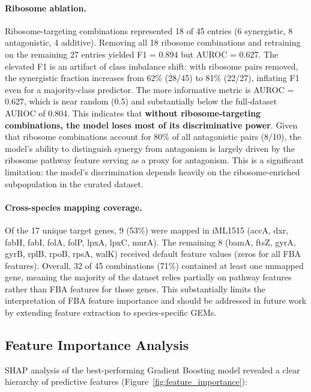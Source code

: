 \documentclass[12pt,a4paper]{article}
\begin{document}
\paragraph{Ribosome ablation.} Ribosome-targeting combinations represented 18 of 45 entries (6 synergistic, 8 antagonistic, 4 additive). Removing all 18 ribosome combinations and retraining on the remaining 27 entries yielded F1 = 0.894 but AUROC = 0.627. The elevated F1 is an artifact of class imbalance shift: with ribosome pairs removed, the synergistic fraction increases from 62\% (28/45) to 81\% (22/27), inflating F1 even for a majority-class predictor. The more informative metric is AUROC = 0.627, which is near random (0.5) and substantially below the full-dataset AUROC of 0.804. This indicates that \textbf{without ribosome-targeting combinations, the model loses most of its discriminative power}. Given that ribosome combinations account for 80\% of all antagonistic pairs (8/10), the model's ability to distinguish synergy from antagonism is largely driven by the ribosome pathway feature serving as a proxy for antagonism. This is a significant limitation: the model's discrimination depends heavily on the ribosome-enriched subpopulation in the curated dataset.

\paragraph{Cross-species mapping coverage.} Of the 17 unique target genes, 9 (53\%) were mapped in iML1515 (accA, dxr, fabH, fabI, folA, folP, lpxA, lpxC, murA). The remaining 8 (bamA, ftsZ, gyrA, gyrB, rplB, rpoB, rpsA, walK) received default feature values (zeros for all FBA features). Overall, 32 of 45 combinations (71\%) contained at least one unmapped gene, meaning the majority of the dataset relies partially on pathway features rather than FBA features for those genes. This substantially limits the interpretation of FBA feature importance and should be addressed in future work by extending feature extraction to species-specific GEMs.

\subsection{Feature Importance Analysis}

SHAP analysis of the best-performing Gradient Boosting model revealed a clear hierarchy of predictive features (Figure~\ref{fig:feature_importance}):
\end{document}
